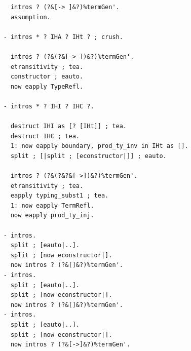 \documentclass[10pt,a4paper]{amsart}
\begin{document}
\begin{lstlisting}
      intros ? (?&[-> ]&?)%termGen'.
      assumption.

    - intros * ? IHA ? IHt ? ; crush.
      
      intros ? (?&(?&[-> ])&?)%termGen'.
      etransitivity ; tea.
      constructor ; eauto.
      now eapply TypeRefl.

    - intros * ? IHI ? IHC ?.
    
      destruct IHI as [? [IHt]] ; tea.
      destruct IHC ; tea.
      1: now eapply boundary, prod_ty_inv in IHt as [].
      split ; [|split ; [econstructor|]] ; eauto.

      intros ? (?&(?&?&[->])&?)%termGen'.
      etransitivity ; tea.
      eapply typing_subst1 ; tea.
      1: now eapply TermRefl.
      now eapply prod_ty_inj.

    - intros.
      split ; [eauto|..].
      split ; [now econstructor|].
      now intros ? (?&[]&?)%termGen'.
    - intros.
      split ; [eauto|..].
      split ; [now econstructor|].
      now intros ? (?&[]&?)%termGen'.
    - intros.
      split ; [eauto|..].
      split ; [now econstructor|].
      now intros ? (?&[->]&?)%termGen'.
    

\end{lstlisting}
\end{document}
